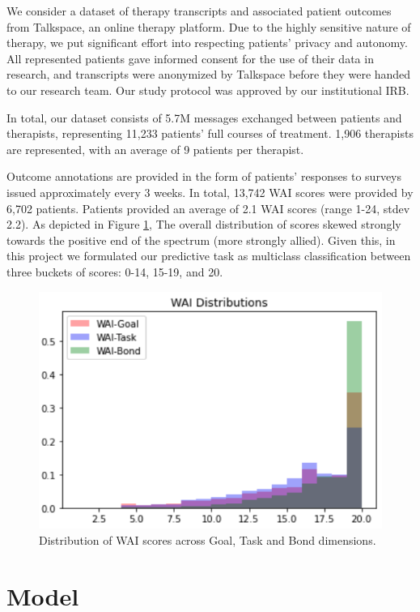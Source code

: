 \documentclass{article}
\begin{document}
We consider a dataset of therapy transcripts and associated patient outcomes from Talkspace, an online therapy platform. Due to the highly sensitive nature of therapy, we put significant effort into respecting patients' privacy and autonomy. All represented patients gave informed consent for the use of their data in research, and transcripts were anonymized by Talkspace before they were handed to our research team. Our study protocol was approved by our institutional IRB.

In total, our dataset consists of 5.7M messages exchanged between patients and therapists, representing 11,233 patients' full courses of treatment. 1,906 therapists are represented, with an average of 9 patients per therapist. 

Outcome annotations are provided in the form of patients' responses to surveys issued approximately every 3 weeks. In total, 13,742 WAI scores were provided by 6,702 patients. Patients provided an average of 2.1 WAI scores (range 1-24, stdev 2.2). As depicted in Figure \ref{fig:wai-distribution}, The overall distribution of scores skewed strongly towards the positive end of the spectrum (more strongly allied). Given this, in this project we formulated our predictive task as multiclass classification between three buckets of scores: 0-14, 15-19, and 20.

\begin{figure}
  \includegraphics[width=\columnwidth]{figs/wai-distribution.png}
  \caption{Distribution of WAI scores across Goal, Task and Bond dimensions.}
  \label{fig:wai-distribution}
\end{figure}


\section{Model}
\label{sec:model}
\end{document}
